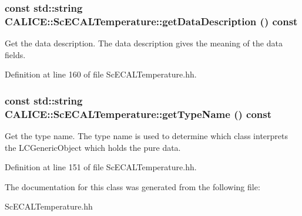 \subsubsection[{getDataDescription}]{\setlength{\rightskip}{0pt plus 5cm}const std::string CALICE::ScECALTemperature::getDataDescription () const\hspace{0.3cm}{\ttfamily  [inline]}}\label{classCALICE_1_1ScECALTemperature_a9879450570b527e671f3596bacbbd900}


Get the data description. The data description gives the meaning of the data fields. 

Definition at line 160 of file ScECALTemperature.hh.
\subsubsection[{getTypeName}]{\setlength{\rightskip}{0pt plus 5cm}const std::string CALICE::ScECALTemperature::getTypeName () const\hspace{0.3cm}{\ttfamily  [inline]}}\label{classCALICE_1_1ScECALTemperature_a263964395b0790195e998f96d7bf87cf}


Get the type name. The type name is used to determine which class interprets the LCGenericObject which holds the pure data. 

Definition at line 151 of file ScECALTemperature.hh.

The documentation for this class was generated from the following file:\begin{DoxyCompactItemize}
\item 
ScECALTemperature.hh\end{DoxyCompactItemize}
